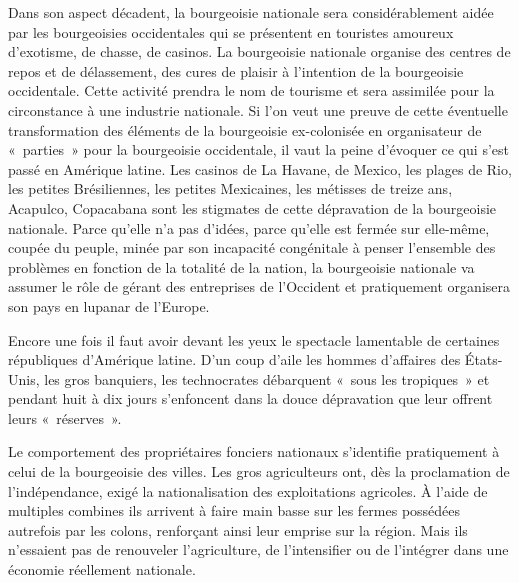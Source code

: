 \documentclass[french,twoside]{book} %
\begin{document}
\noindent Dans son aspect décadent, la bourgeoisie nationale sera considérablement aidée par les bourgeoisies occidentales qui se présentent en touristes amoureux d’exotisme, de chasse, de casinos. La bourgeoisie nationale organise des centres de repos et de délassement, des cures de plaisir à l’intention de la bourgeoisie occidentale. Cette activité prendra le nom de tourisme et sera assimilée pour la circonstance à une industrie nationale. Si l’on veut une preuve de cette éventuelle transformation des éléments de la bourgeoisie ex-colonisée en organisateur de « parties » pour la bourgeoisie occidentale, il vaut la peine d’évoquer ce qui s’est passé en Amérique latine. Les casinos de La Havane, de Mexico, les plages de Rio, les petites Brésiliennes, les petites   Mexicaines, les métisses de treize ans, Acapulco, Copacabana sont les stigmates de cette dépravation de la bourgeoisie nationale. Parce qu’elle n’a pas d’idées, parce qu’elle est fermée sur elle-même, coupée du peuple, minée par son incapacité congénitale à penser l’ensemble des problèmes en fonction de la totalité de la nation, la bourgeoisie nationale va assumer le rôle de gérant des entreprises de l’Occident et pratiquement organisera son pays en lupanar de l’Europe.\par
Encore une fois il faut avoir devant les yeux le spectacle lamentable de certaines républiques d’Amérique latine. D’un coup d’aile les hommes d’affaires des États-Unis, les gros banquiers, les technocrates débarquent « sous les tropiques » et pendant huit à dix jours s’enfoncent dans la douce dépravation que leur offrent leurs « réserves ».\par
\bigbreak
\noindent Le comportement des propriétaires fonciers nationaux s’identifie pratiquement à celui de la bourgeoisie des villes. Les gros agriculteurs ont, dès la proclamation de l’indépendance, exigé la nationalisation des exploitations agricoles. À l’aide de multiples combines ils arrivent à faire main basse sur les fermes possédées autrefois par les colons, renforçant ainsi leur emprise sur la région. Mais ils n’essaient pas de renouveler l’agriculture, de l’intensifier ou de l’intégrer dans une économie réellement nationale.\par
\end{document}
